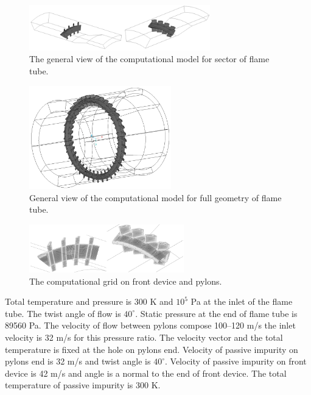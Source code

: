 \documentclass[
11pt,%
tightenlines,%
twoside,%
onecolumn,%
nofloats,%
nobibnotes,%
nofootinbib,%
superscriptaddress,%
noshowpacs,%
centertags]%
{revtex4}
\begin{document}
\begin{figure}[ht]
\setcaptionmargin{5mm}
\onelinecaptionstrue
\includegraphics[width=0.7\textwidth]{pics/p1.png}
\caption{The general view of the computational model for sector of flame tube.}
\label{fig:p1}
\end{figure}

\begin{figure}[ht]
\setcaptionmargin{5mm}
\onelinecaptionstrue
\includegraphics[width=0.55\textwidth]{pics/p2.png}
\caption{General view of the computational
model for full geometry of flame tube.} \label{fig:p2}
\end{figure}

\begin{figure}[ht]
\setcaptionmargin{5mm}
\onelinecaptionstrue
\includegraphics[width=0.6\textwidth]{pics/p3.png}
\caption{The computational grid on front device and pylons.}
\label{fig:p3}
\end{figure}

Total temperature and pressure is 300 K and $10^5$ Pa at the inlet
of the flame tube. The twist angle of flow is $40^{\circ}$. Static
pressure at the end of flame tube is 89560 Pa. The velocity of flow
between pylons compose 100--120 m/s the inlet velocity is 32 m/s for
this pressure ratio. The velocity vector and the total temperature
is fixed at the hole on pylons end. Velocity of passive impurity on
pylons end is 32 m/s and twist angle is $40^{\circ}$. Velocity of
passive impurity on front device is 42 m/s and angle is a normal to
the end of front device. The total temperature of passive impurity
is 300 K.
\end{document}
